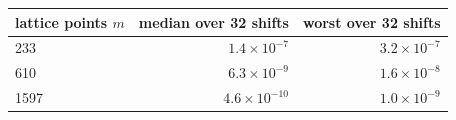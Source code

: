 \begin{tabular}{lrr}
\toprule
lattice points $m$ & median over 32 shifts & worst over 32 shifts \\
\midrule
233 & $1.4\times10^{-7}$ & $3.2\times10^{-7}$ \\
610 & $6.3\times10^{-9}$ & $1.6\times10^{-8}$ \\
1597 & $4.6\times10^{-10}$ & $1.0\times10^{-9}$ \\
\bottomrule
\end{tabular}

